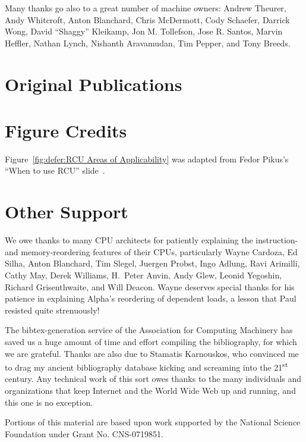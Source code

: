 Many thanks go also to a great number of machine owners:
Andrew Theurer,
Andy Whitcroft,
Anton Blanchard,
Chris McDermott,
Cody Schaefer,
Darrick Wong,
David ``Shaggy'' Kleikamp,
Jon M. Tollefson,
Jose R. Santos,
Marvin Heffler,
Nathan Lynch,
Nishanth Aravamudan,
Tim Pepper,
and
Tony Breeds.

\section{Original Publications}

\ListOriginalPublications

\section{Figure Credits}

\ListContributions

Figure~\ref{fig:defer:RCU Areas of Applicability} was adapted from
Fedor Pikus's ``When to use RCU'' slide~\cite{FedorPikus2017RCUthenWhat}.

\section{Other Support}

We owe thanks to many CPU architects for patiently explaining the
instruction- and memory-reordering features of their CPUs, particularly
Wayne Cardoza, Ed Silha, Anton Blanchard, Tim Slegel, Juergen Probst,
Ingo Adlung, Ravi Arimilli, Cathy May, Derek Williams,
H.~Peter Anvin,
Andy Glew, Leonid Yegoshin,
Richard Grisenthwaite, and Will Deacon.
Wayne deserves special thanks for his patience in explaining Alpha's reordering
of dependent loads, a lesson that Paul resisted quite strenuously!

The bibtex-generation service of the Association for Computing Machinery
has saved us a huge amount of time and effort compiling the bibliography,
for which we are grateful.
Thanks are also due to Stamatis Karnouskos, who convinced me to drag my
ancient bibliography database kicking and screaming into the
21\textsuperscript{st} century.
Any technical work of this sort owes thanks to the many individuals and
organizations that keep Internet and the World Wide Web up and running,
and this one is no exception.

Portions of this material are based upon work supported by the National
Science Foundation under Grant No. CNS-0719851.
